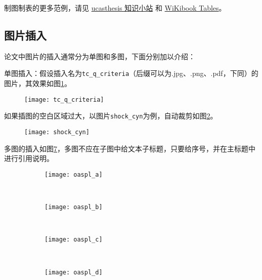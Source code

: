 制图制表的更多范例，请见 \href{https://github.com/mohuangrui/ucasthesis/wiki}{ucasthesis 知识小站} 和 \href{https://en.wikibooks.org/wiki/LaTeX/Tables}{WiKibook Tables}。

\subsection{图片插入}

论文中图片的插入通常分为单图和多图，下面分别加以介绍：

单图插入：假设插入名为\verb|tc_q_criteria|（后缀可以为.jpg、.png、.pdf，下同）的图片，其效果如图\ref{fig:tc_q_criteria}。
\begin{figure}[!htbp]
    \centering
    \texttt{[image: tc\_q\_criteria]}
    \label{fig:tc_q_criteria}
\end{figure}

如果插图的空白区域过大，以图片\verb|shock_cyn|为例，自动裁剪如图\ref{fig:shock_cyn}。
\begin{figure}[!htbp]
    \centering
    \texttt{[image: shock\_cyn]}
    \label{fig:shock_cyn}
\end{figure}

多图的插入如图\ref{fig:oaspl}，多图不应在子图中给文本子标题，只要给序号，并在主标题中进行引用说明。
\begin{figure}[!htbp]
    \centering
    \begin{subfigure}[b]{0.35\textwidth}
      \texttt{[image: oaspl\_a]}
      \caption{}
      \label{fig:oaspl_a}
    \end{subfigure}%
    ~%
    \begin{subfigure}[b]{0.35\textwidth}
      \texttt{[image: oaspl\_b]}
      \caption{}
      \label{fig:oaspl_b}
    \end{subfigure}
    \\%
    \begin{subfigure}[b]{0.35\textwidth}
      \texttt{[image: oaspl\_c]}
      \caption{}
      \label{fig:oaspl_c}
    \end{subfigure}%
    ~%
    \begin{subfigure}[b]{0.35\textwidth}
      \texttt{[image: oaspl\_d]}
      \caption{}
      \label{fig:oaspl_d}
    \end{subfigure}
    \label{fig:oaspl}
\end{figure}

